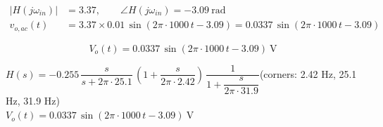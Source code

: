 \documentclass[11pt]{article}
\begin{document}
\begin{align*}
|H(j\omega_{in})| &= 3.37, \qquad \angle H(j\omega_{in}) = -3.09\ \mathrm{rad} \\
v_{o,ac}(t) &= 3.37\times 0.01\,\sin\left(2\pi\cdot 1000\,t - 3.09\right) = 0.0337\,\sin\left(2\pi\cdot 1000\,t - 3.09\right)
\end{align*}

\[
\boxed{V_o(t) = 0.0337\,\sin\left(2\pi\cdot 1000\,t - 3.09\right)\ \mathrm{V}}
\]

\begin{ansbox}
$H(s) = -0.255\,\dfrac{s}{s+2\pi\cdot 25.1}\,\left(1+\dfrac{s}{2\pi\cdot 2.42}\right)\,\dfrac{1}{1+\dfrac{s}{2\pi\cdot 31.9}}$\quad (corners: 2.42 Hz, 25.1 Hz, 31.9 Hz)\\[4pt]
$V_o(t) = 0.0337\,\sin\left(2\pi\cdot 1000\,t - 3.09\right)\ \mathrm{V}$
\end{ansbox}
\end{document}

